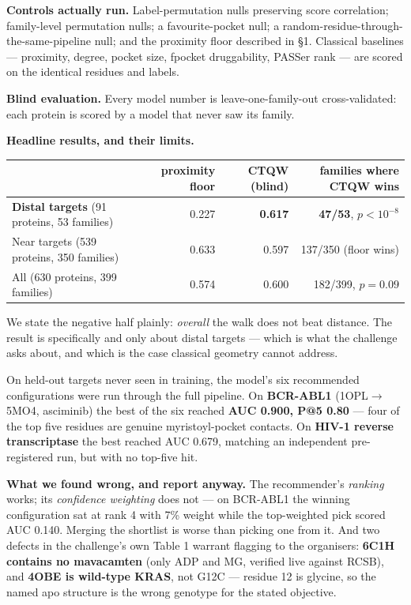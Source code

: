 \documentclass[10pt,a4paper]{article}
\newcommand{\num}[1]{\textbf{#1}}
\begin{document}
\textbf{Controls actually run.} Label-permutation nulls preserving score correlation; family-level
permutation nulls; a favourite-pocket null; a random-residue-through-the-same-pipeline null; and
the proximity floor described in \S1. Classical baselines --- proximity, degree, pocket size,
fpocket druggability, PASSer rank --- are scored on the identical residues and labels.

\textbf{Blind evaluation.} Every model number is leave-one-family-out cross-validated: each protein
is scored by a model that never saw its family.

\textbf{Headline results, and their limits.}

\begin{center}\small
\begin{tabular}{lrrr}
\toprule
& proximity floor & CTQW (blind) & families where CTQW wins \\ \midrule
\textbf{Distal targets} (91 proteins, 53 families) & 0.227 & \num{0.617} & \num{47/53}, $p<10^{-8}$ \\
Near targets (539 proteins, 350 families) & 0.633 & 0.597 & 137/350 (floor wins) \\
All (630 proteins, 399 families) & 0.574 & 0.600 & 182/399, $p=0.09$ \\
\bottomrule
\end{tabular}
\end{center}

We state the negative half plainly: \emph{overall} the walk does not beat distance. The result is
specifically and only about distal targets --- which is what the challenge asks about, and which
is the case classical geometry cannot address.

On held-out targets never seen in training, the model's six recommended configurations were run
through the full pipeline. On \textbf{BCR-ABL1} (1OPL$\to$5MO4, asciminib) the best of the six
reached \num{AUC 0.900, P@5 0.80} --- four of the top five residues are genuine myristoyl-pocket
contacts. On \textbf{HIV-1 reverse transcriptase} the best reached AUC 0.679, matching an
independent pre-registered run, but with no top-five hit.

\textbf{What we found wrong, and report anyway.} The recommender's \emph{ranking} works; its
\emph{confidence weighting} does not --- on BCR-ABL1 the winning configuration sat at rank 4 with
7\% weight while the top-weighted pick scored AUC 0.140. Merging the shortlist is worse than
picking one from it. And two defects in the challenge's own Table 1 warrant flagging to the
organisers: \textbf{6C1H contains no mavacamten} (only ADP and MG, verified live against RCSB), and
\textbf{4OBE is wild-type KRAS}, not G12C --- residue 12 is glycine, so the named apo structure is
the wrong genotype for the stated objective.
\end{document}
